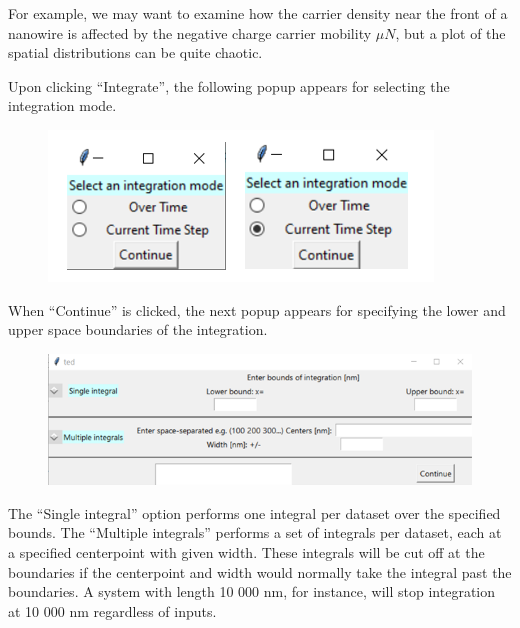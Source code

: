 \documentclass[11pt,letterpaper,titlepage]{article}
\begin{document}
		\par For example, we may want to examine how the carrier density near the front of a nanowire is affected by the negative charge carrier mobility $\mu N$, but a plot of the spatial distributions can be quite chaotic.
		
		\par Upon clicking “Integrate”, the following popup appears for selecting the integration mode.
		
		\begin{figure}[H]
			\label{fig:integration_mode_example}
			\centering
			\includegraphics{"integration_mode_example"}
		\end{figure}
		
		\par When “Continue” is clicked, the next popup appears for specifying the lower and upper space boundaries of the integration.
		
		\begin{figure}[H]
			\label{fig:integration_getbounds_blank}
			\centering
			\includegraphics{"integration_getbounds_blank"}
		\end{figure}
	
		\par The “Single integral” option performs one integral per dataset over the specified bounds. The “Multiple integrals” performs a set of integrals per dataset, each at a specified centerpoint with given width. These integrals will be cut off at the boundaries if the centerpoint and width would normally take the integral past the boundaries. A system with length 10 000 nm, for instance, will stop integration at 10 000 nm regardless of inputs.
		
\end{document}
